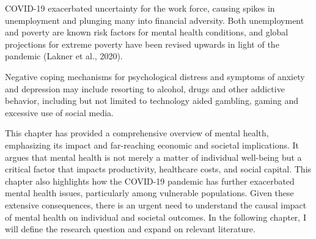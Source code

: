     COVID-19 exacerbated uncertainty for the work force, causing spikes in unemployment and plunging many into financial adversity. Both unemployment and poverty are known risk factors for mental health conditions, and global projections for extreme poverty have been revised upwards in light of the pandemic (Lakner et al., 2020). 

    Negative coping mechanisms for psychological distress and symptoms of anxiety and depression may include resorting to alcohol, drugs and other addictive behavior, including but not limited to technology aided gambling, gaming and excessive use of social media. 


\vspace{0.5 cm}
This chapter has provided a comprehensive overview of mental health, emphasizing its impact and far-reaching economic and societal implications. It argues that mental health is not merely a matter of individual well-being but a critical factor that impacts productivity, healthcare costs, and social capital. This chapter also highlights how the COVID-19 pandemic has further exacerbated mental health issues, particularly among vulnerable populations. Given these extensive consequences, there is an urgent need to understand the causal impact of mental health on individual and societal outcomes. In the following chapter, I will define the research question and expand on relevant literature. 

